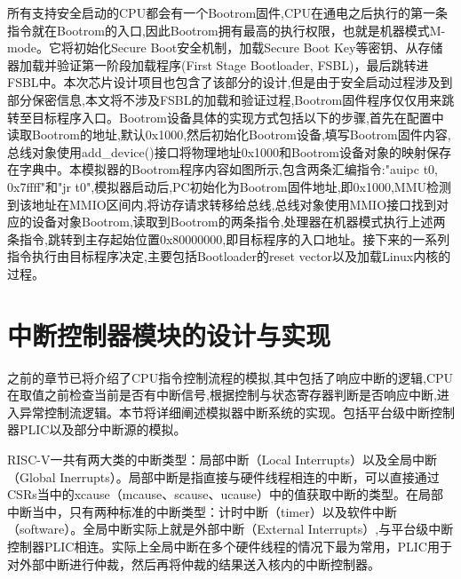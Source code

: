 所有支持安全启动的CPU都会有一个Bootrom固件,CPU在通电之后执行的第一条指令就在Bootrom的入口,因此Bootrom拥有最高的执行权限，也就是机器模式M-mode。它将初始化Secure Boot安全机制，加载Secure Boot Key等密钥、从存储器加载并验证第一阶段加载程序(First Stage Bootloader, FSBL)，最后跳转进FSBL中。本次芯片设计项目也包含了该部分的设计,但是由于安全启动过程涉及到部分保密信息,本文将不涉及FSBL的加载和验证过程,Bootrom固件程序仅仅用来跳转至目标程序入口。Bootrom设备具体的实现方式包括以下的步骤,首先在配置中读取Bootrom的地址,默认0x1000,然后初始化Bootrom设备,填写Bootrom固件内容,总线对象使用add\_device()接口将物理地址0x1000和Bootrom设备对象的映射保存在字典中。本模拟器的Bootrom程序内容如图所示,包含两条汇编指令:"auipc	t0, 0x7ffff"和"jr 	t0",模拟器启动后,PC初始化为Bootrom固件地址,即0x1000,MMU检测到该地址在MMIO区间内,将访存请求转移给总线,总线对象使用MMIO接口找到对应的设备对象Bootrom,读取到Bootrom的两条指令,处理器在机器模式执行上述两条指令,跳转到主存起始位置0x80000000,即目标程序的入口地址。接下来的一系列指令执行由目标程序决定,主要包括Bootloader的reset vector以及加载Linux内核的过程。

\section{中断控制器模块的设计与实现}

之前的章节已将介绍了CPU指令控制流程的模拟,其中包括了响应中断的逻辑,CPU在取值之前检查当前是否有中断信号,根据控制与状态寄存器判断是否响应中断,进入异常控制流逻辑。本节将详细阐述模拟器中断系统的实现。包括平台级中断控制器PLIC以及部分中断源的模拟。


RISC-V一共有两大类的中断类型：局部中断（Local Interrupts）以及全局中断（Global Inerrupts）。局部中断是指直接与硬件线程相连的中断，可以直接通过CSRs当中的xcause（mcause、scause、ucause）中的值获取中断的类型。在局部中断当中，只有两种标准的中断类型：计时中断（timer）以及软件中断（software）。全局中断实际上就是外部中断（External Interrupts）,与平台级中断控制器PLIC相连。实际上全局中断在多个硬件线程的情况下最为常用，PLIC用于对外部中断进行仲裁，然后再将仲裁的结果送入核内的中断控制器。


